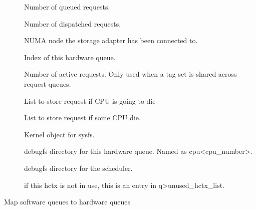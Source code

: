 \documentclass[a4paper,11pt,english]{sphinxmanual}
\begin{document}
\begin{description}
\item[{}] \leavevmode
Number of queued requests.

\item[{}] \leavevmode
Number of dispatched requests.

\item[{}] \leavevmode
NUMA node the storage adapter has been connected to.

\item[{}] \leavevmode
Index of this hardware queue.

\item[{}] \leavevmode
Number of active requests. Only used when a tag set is
shared across request queues.

\item[{}] \leavevmode
List to store request if CPU is going to die

\item[{}] \leavevmode
List to store request if some CPU die.

\item[{}] \leavevmode
Kernel object for sysfs.

\item[{}] \leavevmode
debugfs directory for this hardware queue. Named
as cpu\textless{}cpu\_number\textgreater{}.

\item[{}] \leavevmode
debugfs directory for the scheduler.

\item[{}] \leavevmode
if this hctx is not in use, this is an entry in
q\sphinxhyphen{}\textgreater{}unused\_hctx\_list.

\end{description}

\begin{fulllineitems}
\label{\detokenize{blk-mq:c.blk_mq_queue_map}}
Map software queues to hardware queues

\end{fulllineitems}
\end{document}
